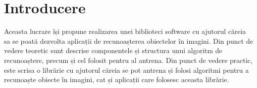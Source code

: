 \chapter{Introducere}

Aceasta lucrare își propune realizarea unei biblioteci software cu ajutorul căreia sa se poată dezvolta aplicații de recunoașterea obiectelor în imagini.
Din punct de vedere teoretic sunt descrise componentele și structura unui algoritm de recunoaștere, precum și cel folosit pentru al antrena.
Din punct de vedere practic, este scrisa o librărie cu ajutorul căreia se pot antrena și folosi algoritmi pentru a recunoaște obiecte în imagini, cat și aplicații care folosesc aceasta librărie.














